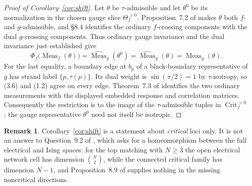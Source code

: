 \documentclass[11pt]{article}
\theoremstyle{definition}
\newtheorem{remark}[theorem]{Remark}
\DeclareMathOperator{\Meas}{Meas}
\DeclareMathOperator{\Crit}{Crit}
\begin{document}
\begin{proof}[Proof of Corollary~\ref{cor:shift}]
Let $\theta$ be $\tau$-admissible and let $\theta^0$ be its normalization
in the chosen gauge slice $\Theta_f^{>0}$. Proposition~7.2 of
\cite{Galashin} makes $\theta$ both $f$- and $g$-admissible, and
\S8.4 identifies the ordinary $f$-crossing components with the dual
$g$-crossing components. Thus ordinary gauge invariance and the dual
invariance just established give
\[
 \Phi_f\bigl(\Meas_f(\theta)\bigr)
 =\widehat{\Meas}_g(\theta^0)
 =\widehat{\Meas}_g(\theta)
 =\Meas_g(\theta).
\]
For the last equality, a boundary edge at $b_p$ of a black-boundary
representative of $g$ has strand label $\{p,\tau(p)\}$.
Its dual weight is $\sin(\pi/2)=1$ by $\tau$-isotropy, so (3.6)
and (1.2) agree on every edge. Theorem~7.3 of \cite{Galashin}
identifies the two ordinary measurements with the displayed embedded
response and correlation matrices. Consequently the restriction is
to the image of the $\tau$-admissible tuples in $\Crit_f^{>0}$;
the gauge representative $\theta^0$ need not itself be isotropic.
\end{proof}

\begin{remark}\label{rem:shift-scope}
Corollary~\ref{cor:shift} is a statement about \emph{critical} loci only. It is not an answer to
Question~9.2 of \cite{GalashinPylyavskyy}, which asks for a homeomorphism between the full electrical and
Ising spaces: for the top matching with $N\ge3$ the open electrical network cell has dimension
$\binom N2$, while the connected critical family has dimension $N-1$, and Proposition~8.9 of
\cite{Galashin} supplies nothing in the missing noncritical directions.
\end{remark}
\end{document}

